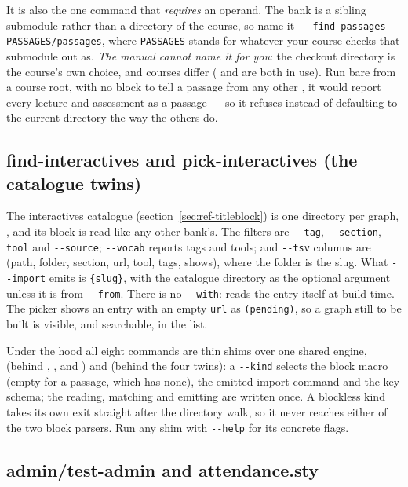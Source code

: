 It is also the one command that \emph{requires} an operand. The bank is a
sibling submodule rather than a directory of the course, so name it ---
\texttt{find-passages PASSAGES/passages}, where \texttt{PASSAGES} stands for
whatever your course checks that submodule out as. \emph{The manual cannot name
it for you}: the checkout directory is the course's own choice, and courses
differ ( and  are both in use).
Run bare from a course root, with no block to tell a passage from any other
, it would report every lecture and assessment as a passage --- so it
refuses instead of defaulting to the current directory the way the others
do.

\subsection*{find-interactives and pick-interactives (the catalogue twins)}

The interactives catalogue (section~\ref{sec:ref-titleblock}) is one
directory per graph, , and its
 block is read like any other bank's. The filters are
\texttt{-{}-tag}, \texttt{-{}-section}, \texttt{-{}-tool} and
\texttt{-{}-source}; \texttt{-{}-vocab} reports tags and tools; and
\texttt{-{}-tsv} columns are (path, folder, section, url, tool, tags, shows),
where the folder is the slug. What \texttt{-{}-import} emits is
\texttt{\{slug\}}, with the catalogue directory as the
optional argument unless it is  from
\texttt{-{}-from}. There is no \texttt{-{}-with}:  reads the
entry itself at build time. The picker shows an entry with an empty
\texttt{url} as \texttt{(pending)}, so a graph still to be built is
visible, and searchable, in the list.

Under the hood all eight commands are thin shims over one shared engine,
 (behind , ,
 and ) and 
(behind the four  twins): a
\texttt{-{}-kind} selects the block
macro (empty for a passage, which has none), the emitted import command and the
key schema; the reading, matching and emitting are written once. A blockless
kind takes its own exit straight after the directory walk, so it never reaches
either of the two block parsers. Run any shim with \texttt{-{}-help} for its concrete
flags.

\subsection*{admin/test-admin and attendance.sty}

